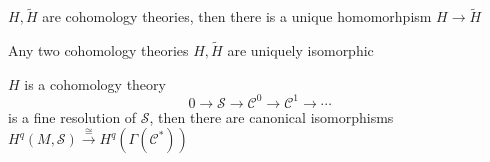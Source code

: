 \documentclass[main]{subfiles}
\begin{document}
\begin{theorem}
$H,\tilde H$ are cohomology theories, then there is a unique homomorhpism $H\to\tilde H$
\end{theorem}

\begin{corollary}
Any two cohomology theories $H,\tilde H$ are uniquely isomorphic
\end{corollary}

\begin{theorem}
$H$ is a cohomology theory
\[0\to\mathcal S\to\mathcal C^0\to\mathcal C^1\to\cdots\]
is a fine resolution of $\mathcal S$, then there are canonical isomorphisms $H^q(M,\mathcal S)\xrightarrow\cong H^q(\Gamma(\mathcal C^*))$
\end{theorem}
\end{document}
